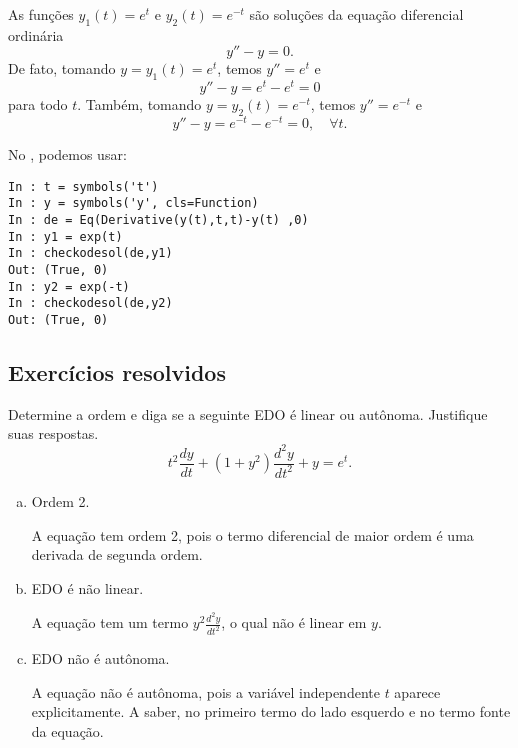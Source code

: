 \begin{ex}
  As funções $y_1(t) = e^t$ e $y_2(t) = e^{-t}$ são soluções da equação diferencial ordinária
  \begin{equation}
    y'' - y = 0.
  \end{equation}
  De fato, tomando $y = y_1(t) = e^t$, temos $y'' = e^t$ e
  \begin{equation}
    y'' - y = e^t - e^t = 0
  \end{equation}
  para todo $t$.
  Também, tomando $y = y_2(t) = e^{-t}$, temos $y'' = e^{-t}$ e
  \begin{equation}
    y'' - y = e^{-t} - e^{-t} = 0, \quad\forall t.
  \end{equation}

  \ifispython
  No \python, podemos usar:
\begin{verbatim}
In : t = symbols('t')
In : y = symbols('y', cls=Function)
In : de = Eq(Derivative(y(t),t,t)-y(t) ,0)
In : y1 = exp(t)
In : checkodesol(de,y1)
Out: (True, 0)
In : y2 = exp(-t)
In : checkodesol(de,y2)
Out: (True, 0)
\end{verbatim}
  \fi
\end{ex}

\subsection*{Exercícios resolvidos}

\begin{exeresol}
  Determine a ordem e diga se a seguinte EDO é linear ou autônoma. Justifique suas respostas.
  \begin{equation}
    t^2\frac{dy}{dt} + (1+y^2)\frac{d^2y}{dt^2} + y = e^t.
  \end{equation}
\end{exeresol}
\begin{resol}
  \begin{enumerate}[a)]
  \item Ordem 2.

    A equação tem ordem 2, pois o termo diferencial de maior ordem é uma derivada de segunda ordem.

  \item EDO é não linear.

    A equação tem um termo $\displaystyle y^2\frac{d^2y}{dt^2}$, o qual não é linear em $y$.

  \item EDO não é autônoma.

    A equação não é autônoma, pois a variável independente $t$ aparece explicitamente. A saber, no primeiro termo do lado esquerdo e no termo fonte da equação.
  \end{enumerate}
\end{resol}

